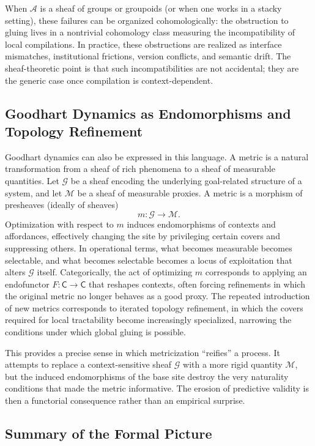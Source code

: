 \documentclass[12pt]{article}
\begin{document}
When $\mathcal{A}$ is a sheaf of groups or groupoids (or when one works in a stacky setting), these failures can be organized cohomologically: the obstruction to gluing lives in a nontrivial cohomology class measuring the incompatibility of local compilations. In practice, these obstructions are realized as interface mismatches, institutional frictions, version conflicts, and semantic drift. The sheaf-theoretic point is that such incompatibilities are not accidental; they are the generic case once compilation is context-dependent.

\subsection{Goodhart Dynamics as Endomorphisms and Topology Refinement}

Goodhart dynamics can also be expressed in this language. A metric is a natural transformation from a sheaf of rich phenomena to a sheaf of measurable quantities. Let $\mathcal{G}$ be a sheaf encoding the underlying goal-related structure of a system, and let $\mathcal{M}$ be a sheaf of measurable proxies. A metric is a morphism of presheaves (ideally of sheaves)
\[
m : \mathcal{G} \longrightarrow \mathcal{M}.
\]
Optimization with respect to $m$ induces endomorphisms of contexts and affordances, effectively changing the site by privileging certain covers and suppressing others. In operational terms, what becomes measurable becomes selectable, and what becomes selectable becomes a locus of exploitation that alters $\mathcal{G}$ itself. Categorically, the act of optimizing $m$ corresponds to applying an endofunctor $F:\mathsf{C}\to\mathsf{C}$ that reshapes contexts, often forcing refinements in which the original metric no longer behaves as a good proxy. The repeated introduction of new metrics corresponds to iterated topology refinement, in which the covers required for local tractability become increasingly specialized, narrowing the conditions under which global gluing is possible.

This provides a precise sense in which metricization ``reifies'' a process. It attempts to replace a context-sensitive sheaf $\mathcal{G}$ with a more rigid quantity $\mathcal{M}$, but the induced endomorphisms of the base site destroy the very naturality conditions that made the metric informative. The erosion of predictive validity is then a functorial consequence rather than an empirical surprise.

\subsection{Summary of the Formal Picture}
\end{document}
